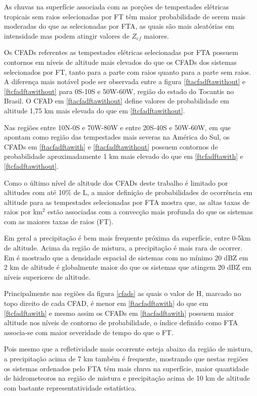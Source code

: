 As chuvas na superfície associada com as porções de tempestades elétricas tropicais sem raios selecionadas por FT têm maior probabilidade de serem mais moderadas do que as selecionadas por FTA, as quais são mais aleatórias em intensidade mas podem atingir valores de $Z_{ef}$ maiores.

Os CFADs referentes as tempestades elétricas selecionadas por FTA possuem contornos em níveis de altitude mais elevados do que os CFADs dos sistemas selecionados por FT, tanto para a parte com raios quanto para a parte sem raios. A diferença mais notável pode ser observada entre a figura \ref{ftacfadftawithout} e \ref{ftcfadftawithout} para 0S-10S e 50W-60W, região do estado do Tocantis no Brasil. O CFAD em \ref{ftacfadftawithout} define valores de probabilidade em altitude 1,75 km mais elevada do que em \ref{ftcfadftawithout}.


Nas regiões entre 10N-0S e 70W-80W e entre 20S-40S e 50W-60W, em que \cite{cecil2005} apontam como região das tempestades mais severas na América do Sul, os CFADs em \ref{ftacfadftawith} e \ref{ftacfadftawithout} possuem contornos de probabilidade aproximadamente 1 km mais elevado do que em \ref{ftcfadftawith} e \ref{ftcfadftawithout}.

Como o último nível de altitude dos CFADs deste trabalho é limitado por altitudes com até 10\% de L, a maior definição de probabilidades de ocorrência em altitude para as tempestades selecionadas por FTA mostra que, as altas taxas de raios por km$^2$ estão associadas com a convecção mais profunda do que os sistemas com as maiores taxas de raios (FT).

Em geral a precipitação é bem mais frequente próxima da superfície, entre 0-5km de altitude. Acima da região de mistura, a precipitação é mais rara de ocorrer. Em \cite{liu2008} é mostrado que a densidade espacial de sistemas com no mínimo 20 dBZ em 2 km de altitude é globalmente maior do que os sistemas que atingem 20 dBZ em níveis superiores de altitude.

Principalmente nas regiões da figura \ref{cfads} as quais o valor de H, marcado no topo direito de cada CFAD, é menor em \ref{ftacfadftawith} do que em \ref{ftcfadftawith} e mesmo assim os CFADs em \ref{ftacfadftawith} possuem maior altitude nos níveis de contorno de probabilidade, o índice definido como FTA associa-se com maior severidade de tempo do que o FT. 

Pois mesmo que a refletividade mais ocorrente esteja abaixo da região de mistura, a precipitação acima de 7 km também é frequente, mostrando que nestas regiões os sistemas ordenados pelo FTA têm mais chuva na superfície, maior quantidade de hidrometeoros na região de mistura e precipitação acima de 10 km de altitude com bastante representatividade estatística.

